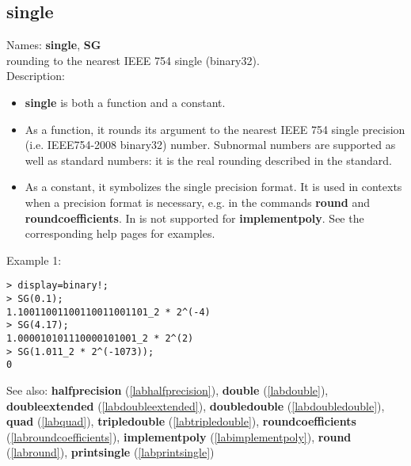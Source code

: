 \subsection{single}
\label{labsingle}
\noindent Names: \textbf{single}, \textbf{SG}\\
rounding to the nearest IEEE 754 single (binary32).\\
\noindent Description: \begin{itemize}

\item \textbf{single} is both a function and a constant.

\item As a function, it rounds its argument to the nearest IEEE 754 single precision (i.e. IEEE754-2008 binary32) number.
   Subnormal numbers are supported as well as standard numbers: it is the real
   rounding described in the standard.

\item As a constant, it symbolizes the single precision format. It is used in 
   contexts when a precision format is necessary, e.g. in the commands 
   \textbf{round} and \textbf{roundcoefficients}. In is not supported for \textbf{implementpoly}.
   See the corresponding help pages for examples.
\end{itemize}
\noindent Example 1: 
\begin{center}\begin{minipage}{15cm}\begin{Verbatim}[frame=single]
> display=binary!;
> SG(0.1);
1.10011001100110011001101_2 * 2^(-4)
> SG(4.17);
1.000010101110000101001_2 * 2^(2)
> SG(1.011_2 * 2^(-1073));
0
\end{Verbatim}
\end{minipage}\end{center}
See also: \textbf{halfprecision} (\ref{labhalfprecision}), \textbf{double} (\ref{labdouble}), \textbf{doubleextended} (\ref{labdoubleextended}), \textbf{doubledouble} (\ref{labdoubledouble}), \textbf{quad} (\ref{labquad}), \textbf{tripledouble} (\ref{labtripledouble}), \textbf{roundcoefficients} (\ref{labroundcoefficients}), \textbf{implementpoly} (\ref{labimplementpoly}), \textbf{round} (\ref{labround}), \textbf{printsingle} (\ref{labprintsingle})
